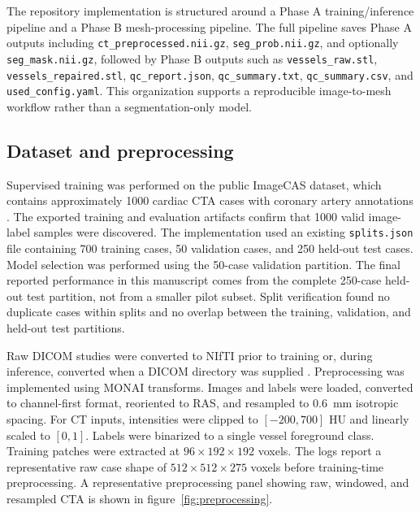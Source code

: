 \documentclass[anonymous]{iopjournal}
\begin{document}
The repository implementation is structured around a Phase A training/inference pipeline and a Phase B mesh-processing pipeline. The full pipeline saves Phase A outputs including \texttt{ct\_preprocessed.nii.gz}, \texttt{seg\_prob.nii.gz}, and optionally \texttt{seg\_mask.nii.gz}, followed by Phase B outputs such as \texttt{vessels\_raw.stl}, \texttt{vessels\_repaired.stl}, \texttt{qc\_report.json}, \texttt{qc\_summary.txt}, \texttt{qc\_summary.csv}, and \texttt{used\_config.yaml}. This organization supports a reproducible image-to-mesh workflow rather than a segmentation-only model.

\subsection{Dataset and preprocessing}
\label{subsec:dataset}

Supervised training was performed on the public ImageCAS dataset, which contains approximately 1000 cardiac CTA cases with coronary artery annotations \cite{zeng2023}. The exported training and evaluation artifacts confirm that 1000 valid image-label samples were discovered. The implementation used an existing \texttt{splits.json} file containing 700 training cases, 50 validation cases, and 250 held-out test cases. Model selection was performed using the 50-case validation partition. The final reported performance in this manuscript comes from the complete 250-case held-out test partition, not from a smaller pilot subset. Split verification found no duplicate cases within splits and no overlap between the training, validation, and held-out test partitions.

Raw DICOM studies were converted to NIfTI prior to training or, during inference, converted when a DICOM directory was supplied \cite{li2016}. Preprocessing was implemented using MONAI transforms. Images and labels were loaded, converted to channel-first format, reoriented to RAS, and resampled to \SI{0.6}{mm} isotropic spacing. For CT inputs, intensities were clipped to $[-200,700]$ HU and linearly scaled to $[0,1]$. Labels were binarized to a single vessel foreground class. Training patches were extracted at $96\times192\times192$ voxels. The logs report a representative raw case shape of $512\times512\times275$ voxels before training-time preprocessing. A representative preprocessing panel showing raw, windowed, and resampled CTA is shown in figure~\ref{fig:preprocessing}.
\end{document}
